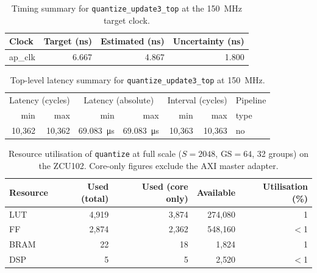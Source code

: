 \begin{table}[H]
  \centering
  \begin{tabular}{lrrr}
    \toprule
    Clock & Target (ns) & Estimated (ns) & Uncertainty (ns) \\
    \midrule
    ap\_clk & 6.667 & 4.867 & 1.800 \\
    \bottomrule
  \end{tabular}
  \caption{Timing summary for \texttt{quantize\_update3\_top} at the
           \SI{150}{\mega\hertz} target clock.}
  \label{tab:quantize_u3_timing}
\end{table}

\begin{table}[H]
  \centering
  \begin{tabular}{rrrrrrl}
    \toprule
    \multicolumn{2}{c}{Latency (cycles)} &
    \multicolumn{2}{c}{Latency (absolute)} &
    \multicolumn{2}{c}{Interval (cycles)} & Pipeline \\
    min & max & min & max & min & max & type \\
    \midrule
    10{,}362 & 10{,}362 & \SI{69.083}{\micro\second} & \SI{69.083}{\micro\second} & 10{,}363 & 10{,}363 & no \\
    \bottomrule
  \end{tabular}
  \caption{Top-level latency summary for \texttt{quantize\_update3\_top}
           at \SI{150}{\mega\hertz}.}
  \label{tab:quantize_u3_top_latency}
\end{table}

\begin{table}[H]
  \centering
  \begin{tabular}{lrrrr}
    \toprule
    Resource & Used (total) & Used (core only) & Available & Utilisation (\%) \\
    \midrule
    LUT  &  4{,}919 &  3{,}874 & 274{,}080 &  1 \\
    FF   &  2{,}874 &  2{,}362 & 548{,}160 & $<$1 \\
    BRAM &       22 &       18 &   1{,}824 &  1 \\
    DSP  &        5 &        5 &   2{,}520 & $<$1 \\
    \bottomrule
  \end{tabular}
  \caption{Resource utilisation of \texttt{quantize} at full scale
           ($S = 2048$, $\text{GS} = 64$, 32 groups) on the ZCU102.
           Core-only figures exclude the AXI master adapter.}
  \label{tab:quantize_u3_resources}
\end{table}

